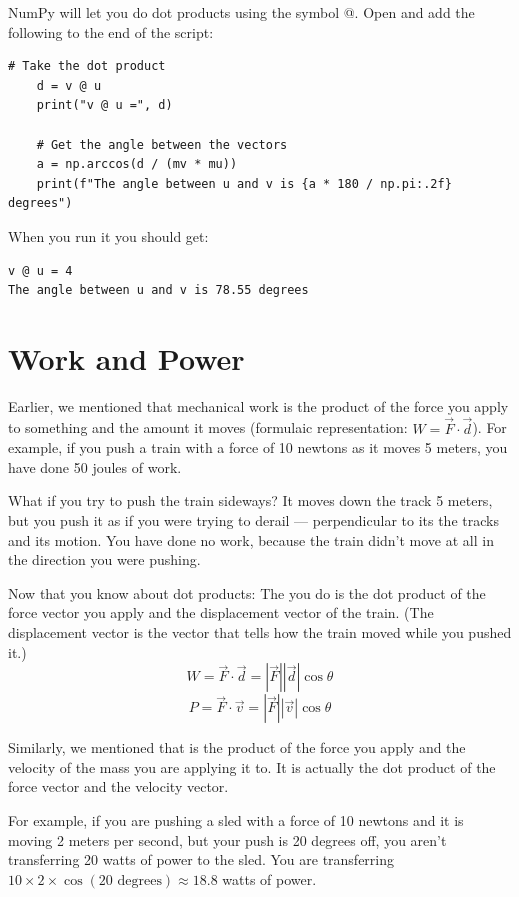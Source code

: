 NumPy will let you do dot products using the symbol @.  Open  
and add the following to the end of the script:

\begin{verbatim}
# Take the dot product
    d = v @ u
    print("v @ u =", d)
    
    # Get the angle between the vectors
    a = np.arccos(d / (mv * mu))
    print(f"The angle between u and v is {a * 180 / np.pi:.2f} degrees")    
\end{verbatim}

When you run it you should get:
\begin{verbatim}
v @ u = 4
The angle between u and v is 78.55 degrees
\end{verbatim}

\section{Work and Power}
Earlier, we mentioned that mechanical work is the product of the 
force you apply to something and the amount it moves (formulaic representation: $W = \vec{F} \cdot \vec{d}$). For example, if you 
push a train with a force of 10 newtons as it moves 5 meters, you have done 50 joules of work.

What if you try to push the train sideways? It moves down the track 5 meters, 
but you push it as if you were trying to derail — perpendicular to its the tracks and its motion.  
You have done no work, because the train didn't move at all in the direction you were pushing.


Now that you know about dot products: The  you do is the dot
product of the force vector you apply and the displacement vector of the train. (The displacement
vector is the vector that tells how the train moved while you pushed it.)
$$W = \vec{F} \cdot \vec{d} = |\vec{F}| |\vec{d}| \cos\theta$$
$$P = \vec{F} \cdot \vec{v} = |\vec{F}| |\vec{v}| \cos\theta$$

Similarly, we mentioned that  is the product of the force you apply and the velocity of the
mass you are applying it to. It is actually the dot product of the force vector and the velocity vector.

For example, if you are pushing a sled with a force of 10 newtons and it is moving 2 meters per second, 
but your push is 20 degrees off, you aren't transferring 20 watts of power to the sled.  
You are transferring $10 \times 2 \times \cos(20 \text{ degrees}) \approx 18.8$ watts of power.

